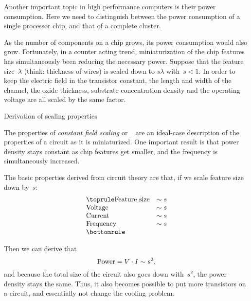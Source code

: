 
Another important topic in high performance computers is their power
consumption. Here
we need to distinguish between the power consumption of a single
processor chip, and that of a complete cluster.

As the number of components on a chip grows, its power consumption
would also grow. Fortunately, in a counter acting trend,
miniaturization of the chip features has simultaneously been reducing
the necessary power. Suppose that the feature size~$\lambda$ (think:
thickness of wires) is scaled down to $s\lambda$ with~$s<1$. In order
to keep the electric field in the transistor constant, the length and
width of the channel, the oxide thickness, substrate concentration
density and the operating voltage are all scaled by the same factor.

 {Derivation of scaling properties}

The properties of \emph{constant field scaling} or
~\cite{Bohr:30yearDennard,Dennard:scaling}
are an ideal-case description of the properties of a circuit
as it is miniaturized. One important result is that power density 
stays constant as chip features get smaller, and the frequency 
is simultaneously increased. 

The basic properties derived from circuit theory are that,
if we scale feature size down by~$s$:
\[
\begin{array}{lc}\toprule
\hbox{Feature size}&\sim s\\
\hbox{Voltage}&\sim s\\
\hbox{Current}&\sim s \\ 
\hbox{Frequency}&\sim s\\
\bottomrule
\end{array}
\]

Then we can derive that 
\[ \hbox{Power} = V\cdot I \sim s^2, \]
and because the total size of the circuit also goes down with~$s^2$,
the power density stays the same.
Thus, it also becomes possible to
put more transistors on a circuit, and essentially not change the cooling
problem.


